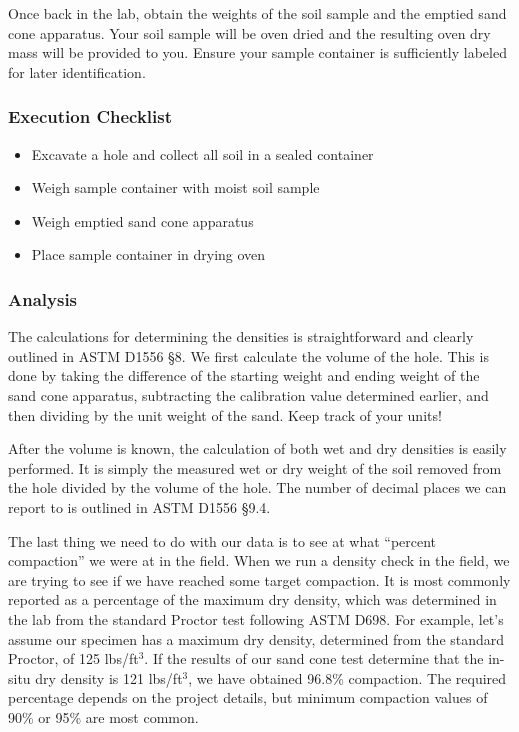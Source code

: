 \documentclass[12pt]{article}
\begin{document}
Once back in the lab, obtain the weights of the soil sample and the emptied sand cone apparatus. Your soil sample will be oven dried and the resulting oven dry mass will be provided to you. Ensure your sample container is sufficiently labeled for later identification.

\subsubsection*{Execution Checklist}
\begin{itemize}
    \item Excavate a hole and collect all soil in a sealed container
    \item Weigh sample container with moist soil sample
    \item Weigh emptied sand cone apparatus
    \item Place sample container in drying oven
\end{itemize}

\subsubsection{Analysis}
The calculations for determining the densities is straightforward and clearly outlined in ASTM D1556 \S8. We first calculate the volume of the hole. This is done by taking the difference of the starting weight and ending weight of the sand cone apparatus, subtracting the calibration value determined earlier, and then dividing by the unit weight of the sand. Keep track of your units!

After the volume is known, the calculation of both wet and dry densities is easily performed. It is simply the measured wet or dry weight of the soil removed from the hole divided by the volume of the hole. The number of decimal places we can report to is outlined in ASTM D1556 \S9.4.

The last thing we need to do with our data is to see at what ``percent compaction'' we were at in the field. When we run a density check in the field, we are trying to see if we have reached some target compaction. It is most commonly reported as a percentage of the maximum dry density, which was determined in the lab from the standard Proctor test following ASTM D698. For example, let's assume our specimen has a maximum dry density, determined from the standard Proctor, of 125 lbs/ft$^3$. If the results of our sand cone test determine that the in-situ dry density is 121 lbs/ft$^3$, we have obtained 96.8\% compaction. The required percentage depends on the project details, but minimum compaction values of 90\% or 95\% are most common.
\end{document}
